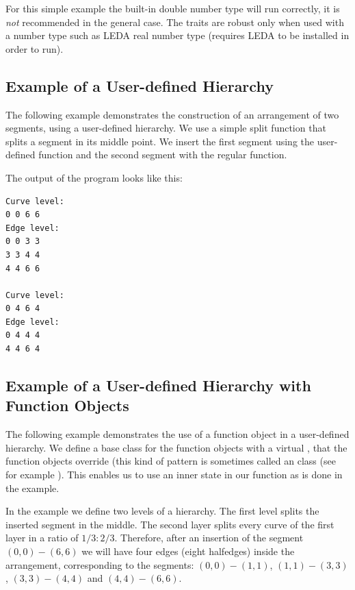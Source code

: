 For this simple example the built-in double
number type will run correctly, it is {\em not} recommended
in the general case. 
The traits are robust only when used with a
number type such as LEDA real number type (requires LEDA to be installed
in order to run). 


\begin{ccAdvanced}
\subsection{Example of a User-defined Hierarchy}
\label{ssec:example4}

The following example demonstrates the construction of an
arrangement of two segments, using a user-defined
hierarchy.
We use a simple split function that splits a segment in its middle
point. We insert the first segment using the user-defined function
and the second segment with the regular function.


The output of the program looks like this:
\begin{verbatim}
Curve level:
0 0 6 6
Edge level:
0 0 3 3
3 3 4 4
4 4 6 6

Curve level:
0 4 6 4
Edge level:
0 4 4 4
4 4 6 4
\end{verbatim}

\end{ccAdvanced}


\begin{ccAdvanced}

\subsection{Example of a User-defined Hierarchy with Function Objects}
\label{ssec:example5}

The following example demonstrates the use of a function object in
a user-defined hierarchy. We define a base class for the function objects
with a virtual , that the function objects override (this
kind of pattern is sometimes called an  class
(see for example \cite[Chapter~25.5]{s-cpl-97}). This enables us to
use an inner state in our function as is done in the example.

In the example we define two levels of a hierarchy. The first level
splits the inserted segment in the middle. The second layer splits every
curve of the first layer in a ratio of $1/3 : 2/3$. Therefore, after
an insertion of the segment $(0,0) - (6,6)$
we will have four edges (eight halfedges)
inside the arrangement, corresponding to the segments: $(0,0) - (1,1)$,
$(1,1) - (3,3)$, $(3,3) - (4,4)$ and $(4,4) - (6,6)$.


\end{ccAdvanced}












